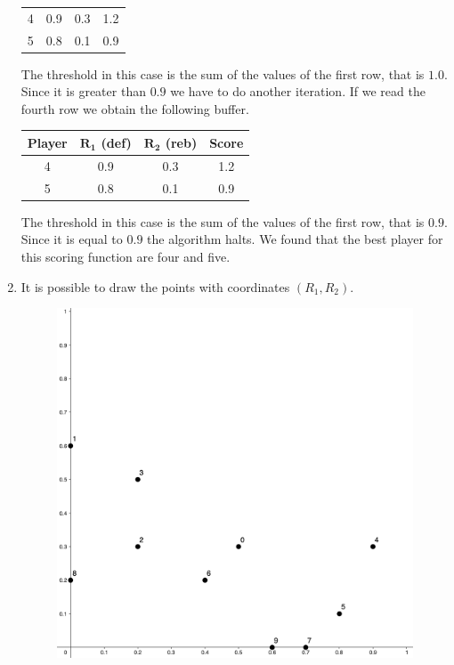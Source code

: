 \documentclass[12pt, a4paper]{report}
\newtheorem[style=M,bodystyle=\normalfont]{theorem}{Theorem}
\newtheorem[style=M,bodystyle=\normalfont]{corollary}{Corollary}
\newtheorem[style=M,bodystyle=\normalfont]{lemma}{Lemma}
\newtheorem[style=M,bodystyle=\normalfont]{definition}{Definition}
\begin{document}
\begin{enumerate}
\begin{table}[H]
\begin{tabular}{c|cc|c}
                4               & 0.9                               & 0.3                               & 1.2            \\
                5               & 0.8                               & 0.1                               & 0.9            \\ \hline
                \end{tabular}
            \end{table}
            The threshold in this case is the sum of the values of the first row, that is $1.0$. Since it is greater than $0.9$ we have to do
            another iteration. If we read the fourth row we obtain the following buffer. 
            \begin{table}[H]
                \centering
                \begin{tabular}{c|cc|c}
                \hline
                \textbf{Player} & \textbf{$\boldsymbol{R_1}$ (def)} & \textbf{$\boldsymbol{R_2}$ (reb)} & \textbf{Score} \\ \hline
                4               & 0.9                               & 0.3                               & 1.2            \\
                5               & 0.8                               & 0.1                               & 0.9            \\ \hline
                \end{tabular}
            \end{table}
            The threshold in this case is the sum of the values of the first row, that is $0.9$. Since it is equal to $0.9$ the algorithm halts. 
            We found that the best player for this scoring function are four and five. 
        \item It is possible to draw the points with coordinates $(R_1,R_2)$. 
            \begin{figure}[H]
                \centering
                \includegraphics[width=0.35\linewidth]{images/skyline.png}
            \end{figure}

\end{enumerate}
\end{document}
